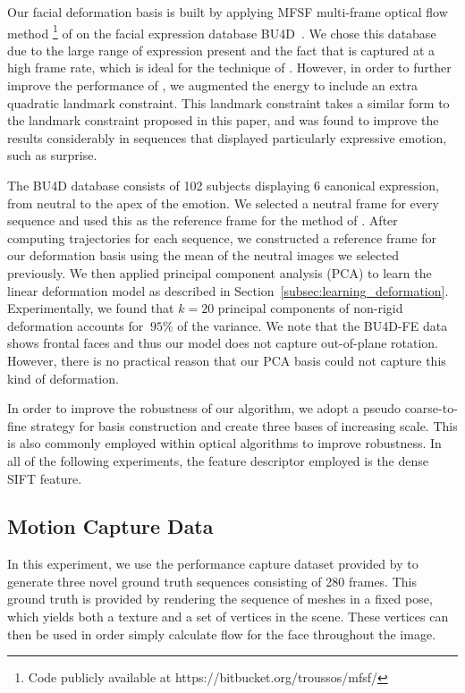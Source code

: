 Our facial deformation basis is built by applying MFSF multi-frame optical flow method
\footnote{Code publicly available at https://bitbucket.org/troussos/mfsf/} of \citet{garg2013variational} on
the facial expression database BU4D~\cite{yin2008high}. We chose this database due
to the large range of expression present and the fact that is captured at a high
frame rate, which is ideal for the technique of \citet{garg2013variational}. However, in order
to further improve the performance of \citet{garg2013variational}, we augmented the energy
to include an extra quadratic landmark constraint. This landmark constraint
takes a similar form to the landmark constraint proposed in this paper, and was
found to improve the results considerably in sequences that displayed particularly
expressive emotion, such as surprise.

The BU4D database consists of 102 subjects displaying 6 canonical expression,
from neutral to the apex of the emotion. We selected a neutral frame for every
sequence and used this as the reference frame for the method of \citet{garg2013variational}.
After computing trajectories for each sequence,
we constructed a reference frame for our deformation basis using the mean
of the neutral images we selected previously. We then applied principal
component analysis (PCA) to learn the linear deformation model as described in Section~\ref{subsec:learning_deformation}.
Experimentally, we found that $k=20$ principal components of
non-rigid deformation accounts for $~95\%$ of the variance.
We note that the BU4D-FE data shows frontal faces and thus our model does not capture out-of-plane
rotation. However, there is no practical reason that our PCA basis could not capture
this kind of deformation.

In order to improve the robustness of our algorithm, we adopt a pseudo coarse-to-fine
strategy for basis construction and create three bases of increasing scale. This is also
commonly employed within optical algorithms to improve robustness. In all of the following experiments,
the feature descriptor employed is the dense SIFT feature.
\subsection{Motion Capture Data}\label{subsec:face_flow_experiments_mocap}
In this experiment, we use the performance capture dataset provided by \citet{zhang2004spacetime}
to generate three novel ground truth sequences consisting of 280 frames. This ground truth is provided by rendering
the sequence of meshes in a fixed pose, which yields both a texture and a set of vertices
in the scene. These vertices can then be used in order simply calculate flow for the face
throughout the image.

